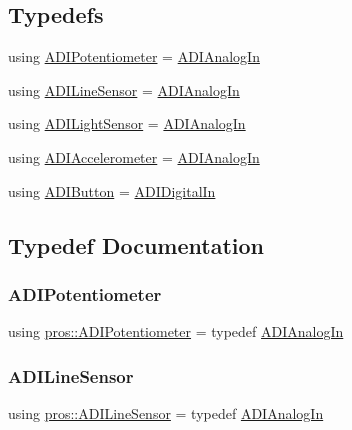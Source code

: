 \subsection*{Typedefs}
\begin{DoxyCompactItemize}
\item 
using \hyperlink{namespacepros_a49b07257293eca610437130d01c47b89}{A\+D\+I\+Potentiometer} = \hyperlink{classpros_1_1ADIAnalogIn}{A\+D\+I\+Analog\+In}
\item 
using \hyperlink{namespacepros_a70a7be425ae5e39c353db03e14d62e9a}{A\+D\+I\+Line\+Sensor} = \hyperlink{classpros_1_1ADIAnalogIn}{A\+D\+I\+Analog\+In}
\item 
using \hyperlink{namespacepros_a105b1224da9401cb8b6949713841fed7}{A\+D\+I\+Light\+Sensor} = \hyperlink{classpros_1_1ADIAnalogIn}{A\+D\+I\+Analog\+In}
\item 
using \hyperlink{namespacepros_afb12c694dcb91a1aa04a6ba7cfd9b6c0}{A\+D\+I\+Accelerometer} = \hyperlink{classpros_1_1ADIAnalogIn}{A\+D\+I\+Analog\+In}
\item 
using \hyperlink{namespacepros_a00d5ba20a966a15bf0276ffda24f2dcf}{A\+D\+I\+Button} = \hyperlink{classpros_1_1ADIDigitalIn}{A\+D\+I\+Digital\+In}
\end{DoxyCompactItemize}


\subsection{Typedef Documentation}
\mbox{\label{namespacepros_a49b07257293eca610437130d01c47b89}} 
\subsubsection{\texorpdfstring{A\+D\+I\+Potentiometer}{ADIPotentiometer}}
{\footnotesize\ttfamily using \hyperlink{namespacepros_a49b07257293eca610437130d01c47b89}{pros\+::\+A\+D\+I\+Potentiometer} = typedef \hyperlink{classpros_1_1ADIAnalogIn}{A\+D\+I\+Analog\+In}}

\mbox{\label{namespacepros_a70a7be425ae5e39c353db03e14d62e9a}} 
\subsubsection{\texorpdfstring{A\+D\+I\+Line\+Sensor}{ADILineSensor}}
{\footnotesize\ttfamily using \hyperlink{namespacepros_a70a7be425ae5e39c353db03e14d62e9a}{pros\+::\+A\+D\+I\+Line\+Sensor} = typedef \hyperlink{classpros_1_1ADIAnalogIn}{A\+D\+I\+Analog\+In}}

